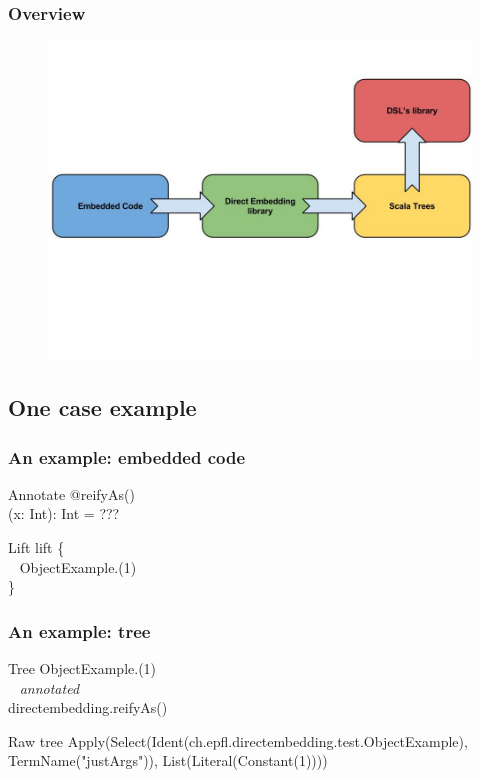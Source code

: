 \documentclass{beamer}
\begin{document}
\begin{frame}
\frametitle{Overview}
\begin{figure}
\includegraphics[width=0.8\linewidth]{./img/flow.jpg}
\end{figure}
\end{frame}

\subsection{One case example}

\begin{frame}
\frametitle{An example: embedded code}
\begin{block}{Annotate}
@reifyAs()\\
 (x: Int): Int = ???
\end{block}

\begin{block}{Lift}
lift \{\\
~ ObjectExample.(1)\\
\}
\end{block}

\end{frame}


\begin{frame}
\frametitle{An example: tree}
\begin{block}{Tree}
ObjectExample.(1)\\
~ \textit{annotated}\\
directembedding.reifyAs()\\
\end{block}

\begin{block}{Raw tree}
Apply(Select(Ident(ch.epfl.directembedding.test.ObjectExample), TermName("justArgs")), List(Literal(Constant(1))))
\end{block}

\end{frame}
\end{document}
